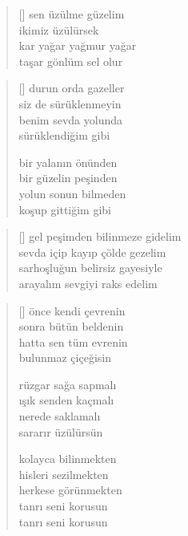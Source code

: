 \documentclass[10pt, openright, twoside]{memoir}
\theoremstyle{definition}
\begin{document}
\vspace*{\fill}
%
\newpage
{}
\vspace*{\fill}
\settowidth{\versewidth}{kar yağar yağmur yağar}
\begin{verse}[\versewidth]
  sen üzülme güzelim \\
  ikimiz üzülürsek \\
  kar yağar yağmur yağar \\
  taşar gönlüm sel olur
\end{verse}
\vspace*{\fill}
%
\newpage
{}
\vspace*{\fill}
\settowidth{\versewidth}{siz de sürüklenmeyin}
\begin{verse}[\versewidth]
  durun orda gazeller \\
  siz de sürüklenmeyin \\
  benim sevda yolunda \\
  sürüklendiğim gibi

  bir yalanın önünden \\
  bir güzelin peşinden \\
  yolun sonun bilmeden \\
  koşup gittiğim gibi
\end{verse}
\vspace*{\fill}
%
\newpage
{}
\vspace*{\fill}
\settowidth{\versewidth}{gel peşimden bilinmeze gidelim}
\begin{verse}[\versewidth]
  gel peşimden bilinmeze gidelim \\
  sevda içip kayıp çölde gezelim \\
  sarhoşluğun belirsiz gayesiyle \\
  arayalım sevgiyi raks edelim
\end{verse}
\vspace*{\fill}
%
\newpage
{}
\vspace*{\fill}
\settowidth{\versewidth}{hatta sen tüm evrenin}
\begin{verse}[\versewidth]
  önce kendi çevrenin \\
  sonra bütün beldenin \\
  hatta sen tüm evrenin \\
  bulunmaz çiçeğisin

  rüzgar sağa sapmalı \\
  ışık senden kaçmalı \\
  nerede saklamalı \\
  sararır üzülürsün

  kolayca bilinmekten \\
  hisleri sezilmekten \\
  herkese görünmekten \\
  tanrı seni korusun \\
  tanrı seni korusun
\end{verse}
\end{document}
